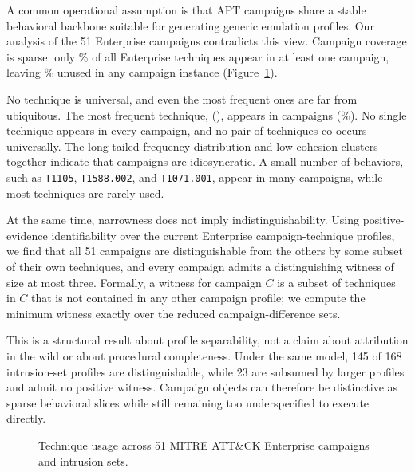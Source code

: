 \documentclass[sigconf]{acmart}
\newcommand{\mitre}{MITRE\xspace}
\newcommand{\attack}{ATT\&CK\xspace}
\begin{document}
A common operational assumption is that APT campaigns share a stable behavioral backbone suitable for generating generic emulation profiles. Our analysis of the 51 Enterprise campaigns contradicts this view. Campaign coverage is sparse: only \campaignCoveragePct\% of all Enterprise techniques appear in at least one campaign, leaving \campaignCoverageUnusedPct\% unused in any campaign instance (Figure~\ref{fig:coverage}).

No technique is universal, and even the most frequent ones are far from ubiquitous. The most frequent technique, \texttt{\topTechniqueId} (\topTechniqueLabel), appears in \topTechniqueInCampaigns{} campaigns (\topTechniquePct\%). No single technique appears in every campaign, and no pair of techniques co-occurs universally. The long-tailed frequency distribution and low-cohesion clusters together indicate that campaigns are idiosyncratic. A small number of behaviors, such as \texttt{T1105}, \texttt{T1588.002}, and \texttt{T1071.001}, appear in many campaigns, while most techniques are rarely used.

At the same time, narrowness does not imply indistinguishability. Using positive-evidence identifiability over the current Enterprise campaign-technique profiles, we find that all 51 campaigns are distinguishable from the others by some subset of their own techniques, and every campaign admits a distinguishing witness of size at most three. Formally, a witness for campaign $C$ is a subset of techniques in $C$ that is not contained in any other campaign profile; we compute the minimum witness exactly over the reduced campaign-difference sets.

This is a structural result about profile separability, not a claim about attribution in the wild or about procedural completeness. Under the same model, 145 of 168 intrusion-set profiles are distinguishable, while 23 are subsumed by larger profiles and admit no positive witness. Campaign objects can therefore be distinctive as sparse behavioral slices while still remaining too underspecified to execute directly.

\begin{figure}[htpb]
\centering
\resizebox{\columnwidth}{!}{}
\caption{Technique usage across 51 \mitre{} \attack{} Enterprise campaigns and \nIntrusionSets{} intrusion sets.}
\label{fig:coverage}
\end{figure}
\end{document}
